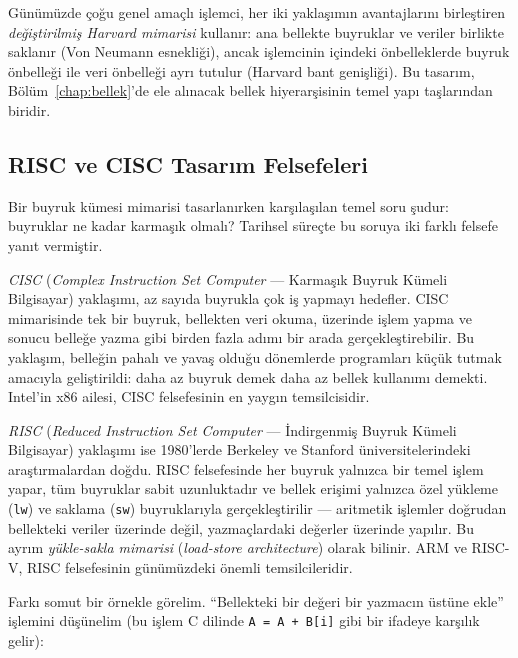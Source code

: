 Günümüzde çoğu genel amaçlı işlemci, her iki yaklaşımın avantajlarını birleştiren \emph{değiştirilmiş Harvard mimarisi} kullanır: ana bellekte buyruklar ve veriler birlikte saklanır (Von Neumann esnekliği), ancak işlemcinin içindeki önbelleklerde buyruk önbelleği ile veri önbelleği ayrı tutulur (Harvard bant genişliği). Bu tasarım, Bölüm~\ref{chap:bellek}'de ele alınacak bellek hiyerarşisinin temel yapı taşlarından biridir.

\subsection{RISC ve CISC Tasarım Felsefeleri}
\label{subsec:risc-cisc}

Bir buyruk kümesi mimarisi tasarlanırken karşılaşılan temel soru şudur: buyruklar ne kadar karmaşık olmalı? Tarihsel süreçte bu soruya iki farklı felsefe yanıt vermiştir.

\emph{CISC} (\emph{Complex Instruction Set Computer} --- Karmaşık Buyruk Kümeli Bilgisayar) yaklaşımı, az sayıda buyrukla çok iş yapmayı hedefler. CISC mimarisinde tek bir buyruk, bellekten veri okuma, üzerinde işlem yapma ve sonucu belleğe yazma gibi birden fazla adımı bir arada gerçekleştirebilir. Bu yaklaşım, belleğin pahalı ve yavaş olduğu dönemlerde programları küçük tutmak amacıyla geliştirildi: daha az buyruk demek daha az bellek kullanımı demekti. Intel'in x86 ailesi, CISC felsefesinin en yaygın temsilcisidir.

\emph{RISC} (\emph{Reduced Instruction Set Computer} --- İndirgenmiş Buyruk Kümeli Bilgisayar) yaklaşımı ise 1980'lerde Berkeley ve Stanford üniversitelerindeki araştırmalardan doğdu. RISC felsefesinde her buyruk yalnızca bir temel işlem yapar, tüm buyruklar sabit uzunluktadır ve bellek erişimi yalnızca özel yükleme (\texttt{lw}) ve saklama (\texttt{sw}) buyruklarıyla gerçekleştirilir --- aritmetik işlemler doğrudan bellekteki veriler üzerinde değil, yazmaçlardaki değerler üzerinde yapılır. Bu ayrım \emph{yükle-sakla mimarisi} (\emph{load-store architecture}) olarak bilinir. ARM ve RISC-V, RISC felsefesinin günümüzdeki önemli temsilcileridir.

Farkı somut bir örnekle görelim. ``Bellekteki bir değeri bir yazmacın üstüne ekle'' işlemini düşünelim (bu işlem C dilinde \texttt{A = A + B[i]} gibi bir ifadeye karşılık gelir):

